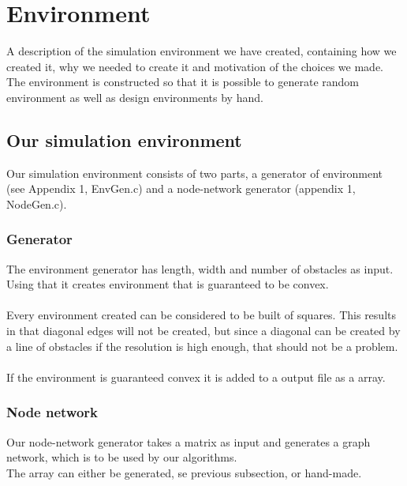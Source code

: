 \chapter{Environment}
A description of the simulation environment we have created, containing how we created it, why we needed to create it and motivation of the choices we made.\\
The environment is constructed so that it is possible to generate random environment as well as design environments by hand.
\section{Our simulation environment}
Our simulation environment consists of two parts, a generator of environment (see Appendix 1, EnvGen.c) and a node-network generator (appendix 1, NodeGen.c).\par
\subsection{Generator}
The environment generator has length, width and number of obstacles as input. Using that it creates environment that is guaranteed to be convex.\\\\
Every environment created can be considered to be built of squares. This results in that diagonal edges will not be created, but since a diagonal can be created by a line of obstacles if the resolution is high enough, that should not be a problem.\\\\
If the environment is guaranteed convex it is added to a output file as a array.
\\
\subsection{Node network}
Our node-network generator takes a matrix as input and generates a graph network, which is to be used by our algorithms.\\
The array can either be generated, se previous subsection, or hand-made.\\